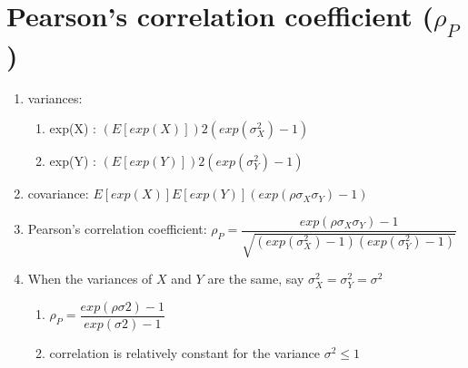 \section{Pearson’s correlation coefficient ($\rho_P$) \cite{ism-1}} \label{Lognormal Distribution: Pearson’s correlation coefficient}

\begin{enumerate}[itemsep=0.2cm]
    \item variances:
    \begin{enumerate}[itemsep=0.2cm]
        \item exp(X) : $(E[exp(X)])2(exp(\sigma_X^2) - 1)$

        \item exp(Y) : $(E[exp(Y)])2(exp(\sigma_Y^2) - 1)$

    \end{enumerate}

    \item covariance: $E[exp(X)]E[exp(Y)](exp(\rho\sigma_X\sigma_Y) - 1)$

    \item Pearson’s correlation coefficient: $
        \rho_P
        = \dfrac{exp(\rho\sigma_X \sigma_Y ) - 1}{\sqrt{(exp(\sigma^2_X ) - 1)(exp(\sigma^2_Y ) - 1)}}
    $

    \item When the variances of $X$ and $Y$ are the same, say $\sigma _X^2 = \sigma _Y^2 = \sigma ^2$
    \begin{enumerate}
        \item $\rho _P = \dfrac{exp(\rho \sigma 2) - 1}{exp(\sigma 2) - 1}$

        \item correlation is relatively constant for the variance $\sigma ^2 \leq 1$

    \end{enumerate}
\end{enumerate}





































